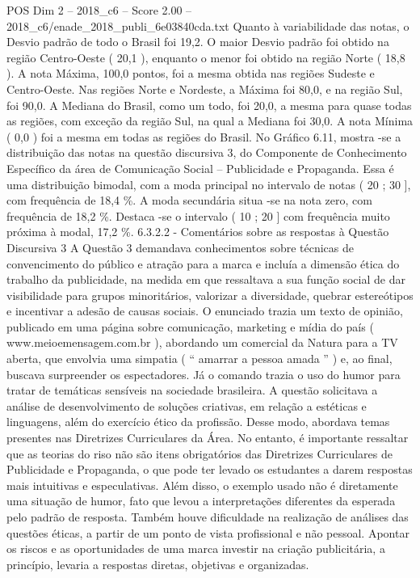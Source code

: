 \begin{textsample}{POS Dim 2 – 2018\_c6 – Score 2.00 – 2018\_c6/enade\_2018\_publi\_6e03840cda.txt}
Quanto à variabilidade das notas, o Desvio padrão de todo o Brasil foi 19,2.
O maior Desvio padrão foi obtido na região Centro-Oeste ( 20,1 ), enquanto o menor foi obtido na região Norte ( 18,8 ).
A nota Máxima, 100,0 pontos, foi a mesma obtida nas regiões Sudeste e Centro-Oeste.
Nas regiões Norte e Nordeste, a Máxima foi 80,0, e na região Sul, foi 90,0.
A Mediana do Brasil, como um todo, foi 20,0, a mesma para quase todas as regiões, com exceção da região Sul, na qual a Mediana foi 30,0.
A nota Mínima ( 0,0 ) foi a mesma em todas as regiões do Brasil.
No Gráfico 6.11, mostra -se a distribuição das notas na questão discursiva 3, do Componente de Conhecimento Específico da área de Comunicação Social – Publicidade e Propaganda.
Essa é uma distribuição bimodal, com a moda principal no intervalo de notas ( 20 ; 30 ], com frequência de 18,4 \%.
A moda secundária situa -se na nota zero, com frequência de 18,2 \%.
Destaca -se o intervalo ( 10 ; 20 ] com frequência muito próxima à modal, 17,2 \%. 6.3.2.2 - Comentários sobre as respostas à Questão Discursiva 3 A Questão 3 demandava conhecimentos sobre técnicas de convencimento do público e atração para a marca e incluía a dimensão ética do trabalho da publicidade, na medida em que ressaltava a sua função social de dar visibilidade para grupos minoritários, valorizar a diversidade, quebrar estereótipos e incentivar a adesão de causas sociais.
O enunciado trazia um texto de opinião, publicado em uma página sobre comunicação, marketing e mídia do país ( www.meioemensagem.com.br ), abordando um comercial da Natura para a TV aberta, que envolvia uma simpatia ( “ amarrar a pessoa amada ” ) e, ao final, buscava surpreender os espectadores.
Já o comando trazia o uso do humor para tratar de temáticas sensíveis na sociedade brasileira.
A questão solicitava a análise de desenvolvimento de soluções criativas, em relação a estéticas e linguagens, além do exercício ético da profissão.
Desse modo, abordava temas presentes nas Diretrizes Curriculares da Área.
No entanto, é importante ressaltar que as teorias do riso não são itens obrigatórios das Diretrizes Curriculares de Publicidade e Propaganda, o que pode ter levado os estudantes a darem respostas mais intuitivas e especulativas.
Além disso, o exemplo usado não é diretamente uma situação de humor, fato que levou a interpretações diferentes da esperada pelo padrão de resposta.
Também houve dificuldade na realização de análises das questões éticas, a partir de um ponto de vista profissional e não pessoal.
Apontar os riscos e as oportunidades de uma marca investir na criação publicitária, a princípio, levaria a respostas diretas, objetivas e organizadas.

\end{textsample}
